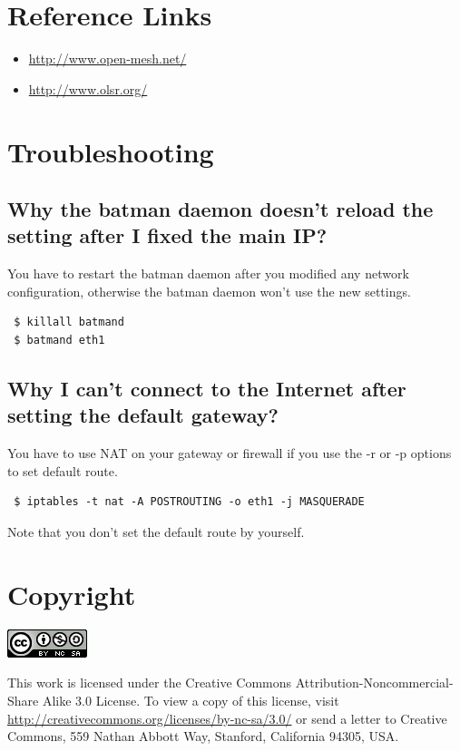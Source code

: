 \documentclass[
	12pt,
	a4paper,
	twoside,
	english,
	headsepline,
	footnosepline,
	automark,
	normalheadings,
	openany,
	cleardoubleplain,
	abstracton,
	idxtotoc,
	liststotoc,
	bibtotoc,
 	BCOR8mm,
]{scrartcl}
\begin{document}
\section{Reference Links}
\begin{itemize}
\item \url{http://www.open-mesh.net/}
\item \url{http://www.olsr.org/}
\end{itemize}

\section{Troubleshooting}
\subsection{Why the batman daemon doesn't reload the setting after I fixed the main IP?}
You have to restart the batman daemon after you modified any network configuration,  otherwise the batman daemon won't use the new settings.
\begin{verbatim}
 $ killall batmand
 $ batmand eth1
\end{verbatim}

\subsection{Why I can't connect to the Internet after setting the default gateway?}
You have to use NAT on your gateway or firewall if you use the -r or -p options to set default route.
\begin{verbatim}
 $ iptables -t nat -A POSTROUTING -o eth1 -j MASQUERADE
\end{verbatim}
Note that you don't set the default route by yourself.

\vfill
\section*{Copyright}
\begin{center}
 \includegraphics[scale=0.8]{byncsa30}
\end{center}
This work is licensed under the Creative Commons Attribution-Noncommercial-Share Alike 3.0 License. To
view a copy of this license, visit \url{http://creativecommons.org/licenses/by-nc-sa/3.0/} or send a letter to Creative  Commons, 559 Nathan Abbott Way, Stanford, California 94305, USA.
\end{document}

